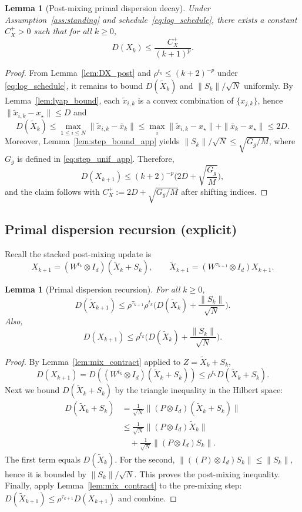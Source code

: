 \documentclass[10pt,twocolumn,letterpaper]{article}
\def\one{1}%
\def\J{J}%
\def\Pmat{P}%
\theoremstyle{compact}
\newtheorem{lemma}[theorem]{Lemma}
\theoremstyle{compactremark}
\newcommand{\one}{\mathbf{1}}
\newcommand{\J}{\left(\frac{1}{N}\one\one^\top\right)}
\newcommand{\Pmat}{I-\J}
\begin{document}
\begin{lemma}[Post-mixing primal dispersion decay]\label{lem:DX_post_decay}
Under Assumption~\ref{ass:standing} and schedule~\eqref{eq:log_schedule}, there exists a constant $C_X^{+}>0$ such that for all $k\ge 0$,
\[
D(X_k)\le \frac{C_X^{+}}{(k+1)^{p}}.
\]
\end{lemma}
\begin{proof}
From Lemma~\ref{lem:DX_post} and $\rho^{t_k}\le (k+2)^{-p}$ under \eqref{eq:log_schedule}, it remains to bound
$D(\tilde X_k)$ and $\|S_k\|/\sqrt N$ uniformly.
By Lemma~\ref{lem:lyap_bound}, each $\tilde x_{i,k}$ is a convex combination of $\{x_{j,k}\}$, hence $\|\tilde x_{i,k}-x_\star\|\le D$ and
\[
D(\tilde X_k)\le \max_{1\le i\le N}\|\tilde x_{i,k}-\bar x_k\|
\le \max_i \|\tilde x_{i,k}-x_\star\|+\|\bar x_k-x_\star\|\le 2D.
\]
Moreover, Lemma~\ref{lem:step_bound_app} yields $\|S_k\|/\sqrt N\le \sqrt{G_g/M}$, where $G_g$ is defined in \eqref{eq:step_unif_app}.
Therefore,
\[
D(X_{k+1})\le (k+2)^{-p}\Big(2D+\sqrt{\frac{G_g}{M}}\Big),
\]
and the claim follows with $C_X^{+}:=2D+\sqrt{G_g/M}$ after shifting indices.
\end{proof}

\subsection{Primal dispersion recursion (explicit)}

Recall the stacked post-mixing update is
\[
X_{k+1}=(W^{t_k}\otimes I_d)(\tilde X_k+S_k),
\qquad
\tilde X_{k+1}=(W^{\tau_{k+1}}\otimes I_d)X_{k+1}.
\]
\begin{lemma}[Primal dispersion recursion]\label{lem:DX_rec}
For all $k\ge0$,
\[
D(\tilde X_{k+1})
\le \rho^{\tau_{k+1}}\rho^{t_k}\Big(D(\tilde X_k)+\frac{\|S_k\|}{\sqrt N}\Big).
\]
Also,
\[
D(X_{k+1})
\le \rho^{t_k}\Big(D(\tilde X_k)+\frac{\|S_k\|}{\sqrt N}\Big).
\]
\end{lemma}
\begin{proof}
By Lemma~\ref{lem:mix_contract} applied to $Z=\tilde X_k+S_k$,
\[
D(X_{k+1})=D((W^{t_k}\otimes I_d)(\tilde X_k+S_k))\le \rho^{t_k}D(\tilde X_k+S_k).
\]
Next we bound $D(\tilde X_k+S_k)$ by the triangle inequality in the Hilbert space:
\begin{align*}
D(\tilde X_k\!+\!S_k)
&=\tfrac1{\sqrt N}\|(\Pmat\!\otimes\! I_d)(\tilde X_k\!+\!S_k)\|\\
&\le \tfrac1{\sqrt N}\|(\Pmat\!\otimes\! I_d)\tilde X_k\|\\
&\quad+\tfrac1{\sqrt N}\|(\Pmat\!\otimes\! I_d)S_k\|.
\end{align*}
The first term equals $D(\tilde X_k)$.
For the second, $\|((\Pmat)\otimes I_d)S_k\|\le \|S_k\|$, hence it is bounded by $\|S_k\|/\sqrt N$.
This proves the post-mixing inequality.
Finally, apply Lemma~\ref{lem:mix_contract} to the pre-mixing step:
$D(\tilde X_{k+1})\le \rho^{\tau_{k+1}}D(X_{k+1})$ and combine.
\end{proof}
\end{document}
